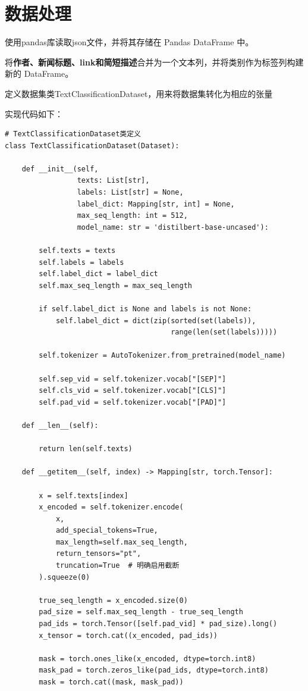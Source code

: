 \documentclass{article}
\begin{document}
\section{数据处理}
使用pandas库读取json文件，并将其存储在 Pandas DataFrame 中。\par
将\textbf{作者、新闻标题、link和简短描述}合并为一个文本列，并将类别作为标签列构建新的 DataFrame。\par
定义数据集类TextClassificationDataset，用来将数据集转化为相应的张量\par
实现代码如下：
\begin{lstlisting}[style=Style]
# TextClassificationDataset类定义
class TextClassificationDataset(Dataset):

    def __init__(self,
                 texts: List[str],
                 labels: List[str] = None,
                 label_dict: Mapping[str, int] = None,
                 max_seq_length: int = 512,
                 model_name: str = 'distilbert-base-uncased'):

        self.texts = texts
        self.labels = labels
        self.label_dict = label_dict
        self.max_seq_length = max_seq_length

        if self.label_dict is None and labels is not None:
            self.label_dict = dict(zip(sorted(set(labels)),
                                       range(len(set(labels)))))

        self.tokenizer = AutoTokenizer.from_pretrained(model_name)

        self.sep_vid = self.tokenizer.vocab["[SEP]"]
        self.cls_vid = self.tokenizer.vocab["[CLS]"]
        self.pad_vid = self.tokenizer.vocab["[PAD]"]

    def __len__(self):

        return len(self.texts)

    def __getitem__(self, index) -> Mapping[str, torch.Tensor]:

        x = self.texts[index]
        x_encoded = self.tokenizer.encode(
            x,
            add_special_tokens=True,
            max_length=self.max_seq_length,
            return_tensors="pt",
            truncation=True  # 明确启用截断
        ).squeeze(0)

        true_seq_length = x_encoded.size(0)
        pad_size = self.max_seq_length - true_seq_length
        pad_ids = torch.Tensor([self.pad_vid] * pad_size).long()
        x_tensor = torch.cat((x_encoded, pad_ids))

        mask = torch.ones_like(x_encoded, dtype=torch.int8)
        mask_pad = torch.zeros_like(pad_ids, dtype=torch.int8)
        mask = torch.cat((mask, mask_pad))


\end{lstlisting}
\end{document}
